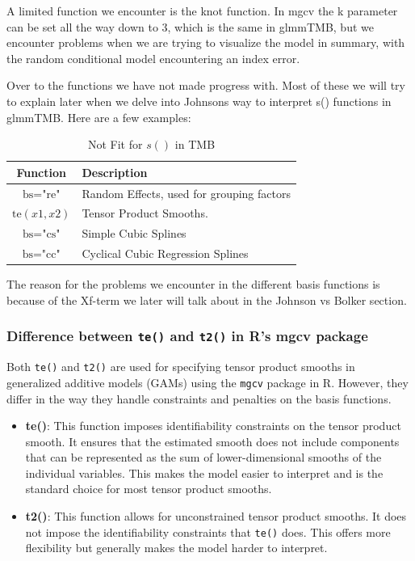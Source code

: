 A limited function we encounter is the knot function. In mgcv the k parameter can be set all the way down to 3, which is the same in glmmTMB, but we encounter problems when we are trying to visualize the model in summary, with the random conditional model encountering an index error.






\newline
Over to the functions we have not made progress with. Most of these we will try to explain later when we delve into Johnsons way to interpret s() functions in glmmTMB. Here are a few examples:

\begin{table}[h]
    \centering
    \caption{Not Fit for \( s() \) in TMB}
    \label{tab:NotFitForTMB}
    \begin{tabularx}{\textwidth}{|c|X|}
        \hline
        Function & Description \\
        \hline
        \( \text{bs} = \text{"re"} \) & Random Effects, used for grouping factors \\
        \hline
        \( \text{te}(x1, x2) \) &   Tensor Product Smooths. \\
        \hline
        \( \text{bs} = \text{"cs"} \) &  Simple Cubic Splines  \\
        \hline
        \( \text{bs} = \text{"cc"} \) &  Cyclical Cubic Regression Splines \\
        \hline
    \end{tabularx}
\end{table}

The reason for the problems we encounter in the different basis functions is because of the Xf-term we later will talk about in the Johnson vs Bolker section.


\subsubsection{Difference between \texttt{te()} and \texttt{t2()} in R's mgcv package}

Both \texttt{te()} and \texttt{t2()} are used for specifying tensor product smooths in generalized additive models (GAMs) using the \texttt{mgcv} package in R. However, they differ in the way they handle constraints and penalties on the basis functions.

\begin{itemize}
    \item \textbf{te()}: This function imposes identifiability constraints on the tensor product smooth. It ensures that the estimated smooth does not include components that can be represented as the sum of lower-dimensional smooths of the individual variables. This makes the model easier to interpret and is the standard choice for most tensor product smooths.
    
    \item \textbf{t2()}: This function allows for unconstrained tensor product smooths. It does not impose the identifiability constraints that \texttt{te()} does. This offers more flexibility but generally makes the model harder to interpret.
\end{itemize}

